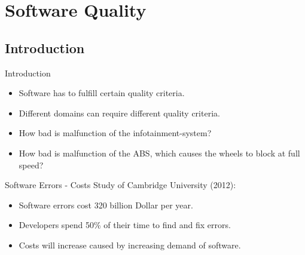 \section{Software Quality}


\subsection{Introduction}

\begin{frame}{Introduction}
\begin{itemize}
	\item Software has to fulfill certain quality criteria.
	\item Different domains can require different quality criteria.
	\item How bad is malfunction of the infotainment-system?
	\item How bad is malfunction of the ABS, which causes the wheels to block at full speed?
\end{itemize}
\end{frame}

\begin{frame}{Software Errors - Costs}
Study of Cambridge University (2012):
\begin{itemize}
	\item Software errors cost 320 billion Dollar per year.
	\item Developers spend 50\% of their time to find and fix errors.
	\item Costs will increase caused by increasing demand of software.
\end{itemize}
\end{frame}




